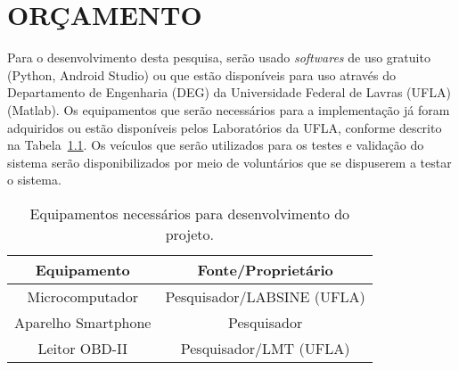 \chapter{ORÇAMENTO}
\label{cap:orcamento}

Para o desenvolvimento desta pesquisa, serão usado \textit{softwares} de uso gratuito (Python, Android Studio) ou que estão disponíveis para uso através do Departamento de Engenharia (DEG) da Universidade Federal de Lavras (UFLA) (Matlab).  Os equipamentos que serão necessários para a implementação já foram adquiridos ou estão disponíveis pelos Laboratórios da UFLA, conforme descrito na Tabela~\ref{tab:orca}. Os veículos que serão utilizados para os testes e validação do sistema serão disponibilizados por meio de voluntários que se dispuserem a testar o sistema.

\begin{table}[!htb]
	\centering
	\caption{Equipamentos necessários para desenvolvimento do projeto.}
	\label{tab:orca}
\begin{tabular}{cc}
\hline
\multicolumn{1}{c}{Equipamento} & Fonte/Proprietário \\ \hline
Microcomputador & Pesquisador/LABSINE (UFLA) \\
Aparelho Smartphone & Pesquisador \\
Leitor OBD-II & Pesquisador/LMT (UFLA) \\ \hline
\end{tabular}\\
\end{table}